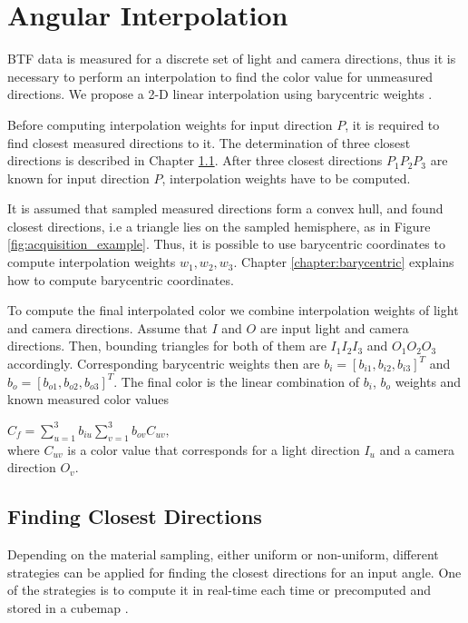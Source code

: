 \section{Angular Interpolation}
\label{chapter:interpolation}


BTF data is measured for a discrete set of light and camera directions, thus it is necessary to perform an interpolation to find the color value for unmeasured directions.
We propose a 2-D linear interpolation using barycentric weights \cite{haindl_visual}. 


Before computing interpolation weights for input direction $P$, it is required to find closest measured directions to it.
The determination of three closest directions is described in Chapter \ref{chapter:finding_triangle}. 
After three closest directions $P_{1}P_{2}P_{3}$ are known for input direction $P$, interpolation weights have to be computed.

 It is assumed that sampled measured directions form a convex hull, and found closest directions, i.e a triangle lies on the sampled hemisphere, as in Figure \ref{fig:acquisition_example}.
 Thus, it is possible to use barycentric coordinates to compute interpolation weights $w_{1},w_{2},w_{3}$.
  Chapter \ref{chapter:barycentric} explains how to compute barycentric coordinates.
  
To compute the final interpolated color we combine interpolation weights of light and camera directions.
Assume that $I$ and $O$ are input light and camera directions. 
Then, bounding triangles for both of them are $I_{1}I_{2}I_{3}$ and $O_{1}O_{2}O_{3}$ accordingly.
Corresponding barycentric weights then are $b_{i}=[b_{i1},b_{i2},b_{i3}]^T$ and $b_{o}=[b_{o1},b_{o2},b_{o3}]^T$.
The final color is the linear combination of $b_{i}$, $b_{o}$ weights and known measured color values 

 {\centering $ C_{f}=\sum_{u=1}^{3}b_{iu}\sum_{v=1}^{3}b_{ov}C_{uv},$\\} where $C_{uv}$ is a color value that corresponds for a light direction $I_{u}$ and a camera direction $O_{v}$.

\subsection{Finding Closest Directions}
\label{chapter:finding_triangle}
Depending on the material sampling, either uniform or non-uniform, different strategies can be applied for finding the closest directions for an input angle.
One of the strategies is to compute it in real-time each time or precomputed and stored in a cubemap \cite{haindl}.

